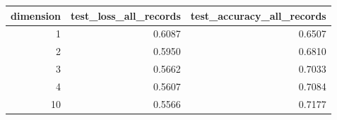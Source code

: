 \begin{tabular}{rrr}
\toprule
dimension & test_loss_all_records & test_accuracy_all_records \\
\midrule
1 & 0.6087 & 0.6507 \\
2 & 0.5950 & 0.6810 \\
3 & 0.5662 & 0.7033 \\
4 & 0.5607 & 0.7084 \\
10 & 0.5566 & 0.7177 \\
\bottomrule
\end{tabular}
